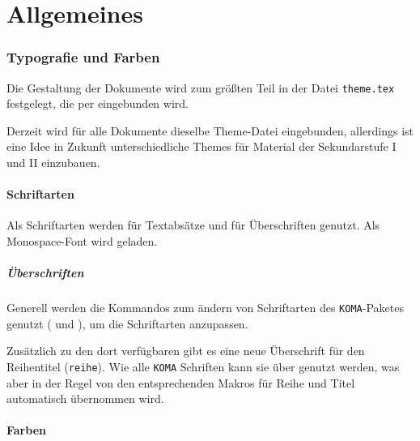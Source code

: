 \part{Allgemeines}

\section{Typografie und Farben}
Die Gestaltung der Dokumente wird zum größten Teil in der Datei \texttt{theme.tex} festgelegt, die per  eingebunden wird.

Derzeit wird für alle Dokumente dieselbe Theme-Datei eingebunden, allerdings ist eine Idee in Zukunft unterschiedliche Themes für Material der Sekundarstufe I und II einzubauen.

\subsection{Schriftarten}
Als Schriftarten werden  für Textabsätze und  für Überschriften genutzt. Als Monospace-Font wird  geladen.

\subsubsection{Überschriften}
Generell werden die Kommandos zum ändern von Schriftarten des \texttt{KOMA}-Paketes genutzt ( und ), um die Schriftarten anzupassen.

Zusätzlich zu den dort verfügbaren gibt es eine neue Überschrift für den Reihentitel (\texttt{reihe}). Wie alle \texttt{KOMA} Schriften kann sie über  genutzt werden, was  aber in der Regel von den entsprechenden Makros für Reihe und Titel automatisch übernommen wird.

\subsection{Farben}